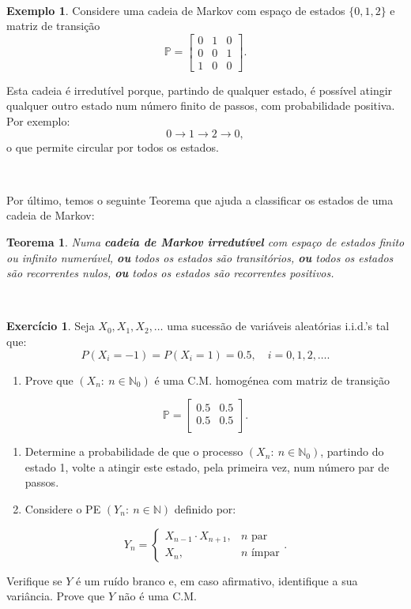 \documentclass[
  11pt,
  a4paper,
]{book}
\providecommand{\tightlist}{%
  \setlength{\itemsep}{0pt}\setlength{\parskip}{0pt}}
\newtheorem{theorem}{Teorema}[chapter]
\theoremstyle{definition}
\theoremstyle{definition}
\newtheorem{example}{Exemplo}[chapter]
\theoremstyle{definition}
\newtheorem{exercise}{Exercício}[chapter]
\theoremstyle{definition}
\theoremstyle{remark}
\begin{document}
\(\,\)

\begin{example}
Considere uma cadeia de Markov com espaço de estados \(\{0, 1, 2\}\) e matriz de transição
\[
\mathbb{P} =
\begin{bmatrix}
0 & 1 & 0 \\
0 & 0 & 1 \\
1 & 0 & 0
\end{bmatrix}.
\]

Esta cadeia é irredutível porque, partindo de qualquer estado, é possível atingir qualquer outro estado num número finito de passos, com probabilidade positiva. Por exemplo:
\[
0 \longrightarrow 1 \longrightarrow 2 \longrightarrow 0,
\]
o que permite circular por todos os estados.
\end{example}

\(\,\)

Por último, temos o seguinte Teorema que ajuda a classificar os estados de uma cadeia de Markov:

\begin{theorem}
Numa \textbf{cadeia de Markov irredutível} com espaço de estados finito ou infinito numerável, \textbf{ou} todos os estados são transitórios, \textbf{ou} todos os estados são recorrentes nulos, \textbf{ou} todos os estados são recorrentes positivos.
\end{theorem}

\(\,\)

\begin{exercise}
Seja \(X_0, X_1, X_2, \dots\) uma sucessão de variáveis aleatórias i.i.d.'s tal que:
\[P(X_i=-1)=P(X_i=1)=0.5, \quad i=0,1,2,\dots.\]

\begin{enumerate}
\def\labelenumi{(\alph{enumi})}
\tightlist
\item
  Prove que \((X_n: ~n \in \mathbb{N}_0)\) é uma C.M. homogénea com matriz de transição
\end{enumerate}

\[\mathbb{P}=
\begin{bmatrix}
0.5 & 0.5  \\
0.5 & 0.5  \\
\end{bmatrix}.
\]

\begin{enumerate}
\def\labelenumi{(\alph{enumi})}
\setcounter{enumi}{1}
\item
  Determine a probabilidade de que o processo \((X_n: ~n \in \mathbb{N}_0)\), partindo do estado 1, volte a atingir este estado, pela primeira vez, num número par de passos.
\item
  Considere o PE \((Y_n: ~n \in \mathbb{N})\) definido por:
\end{enumerate}

\[
Y_n=
\begin{cases}
X_{n-1} \cdot X_{n+1}, & n \text{ par}\\
X_{n}, & n \text{ ímpar}
\end{cases}.
\]

Verifique se \(Y\) é um ruído branco e, em caso afirmativo, identifique a sua variância. Prove que \(Y\) não é uma C.M.
\end{exercise}
\end{document}
